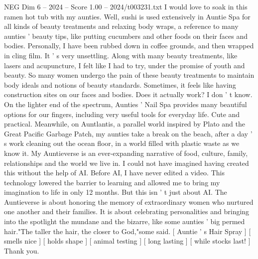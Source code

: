\begin{textsample}{NEG Dim 6 – 2024 – Score 1.00 – 2024/t003231.txt}
I would love to soak in this ramen hot tub with my aunties.
Well, sushi is used extensively in Auntie Spa for all kinds of beauty treatments and relaxing body wraps, a reference to many aunties ' beauty tips, like putting cucumbers and other foods on their faces and bodies.
Personally, I have been rubbed down in coffee grounds, and then wrapped in cling film.
It ' s very unsettling.
Along with many beauty treatments, like lasers and acupuncture, I felt like I had to try, under the promise of youth and beauty.
So many women undergo the pain of these beauty treatments to maintain body ideals and notions of beauty standards.
Sometimes, it feels like having construction sites on our faces and bodies.
Does it actually work?
I don ' t know.
On the lighter end of the spectrum, Aunties ' Nail Spa provides many beautiful options for our fingers, including very useful tools for everyday life.
Cute and practical.
Meanwhile, on Auntlantis, a parallel world inspired by Plato and the Great Pacific Garbage Patch, my aunties take a break on the beach, after a day ' s work cleaning out the ocean floor, in a world filled with plastic waste as we know it.
My Auntieverse is an ever-expanding narrative of food, culture, family, relationships and the world we live in.
I could not have imagined having created this without the help of AI.
Before AI, I have never edited a video.
This technology lowered the barrier to learning and allowed me to bring my imagination to life in only 12 months.
But this isn ' t just about AI.
The Auntieverse is about honoring the memory of extraordinary women who nurtured one another and their families.
It is about celebrating personalities and bringing into the spotlight the mundane and the bizarre, like some aunties ' big permed hair."The taller the hair, the closer to God,"some said. [ Auntie ' s Hair Spray ] [ smells nice ] [ holds shape ] [ animal testing ] [ long lasting ] [ while stocks last! ] Thank you.

\end{textsample}
